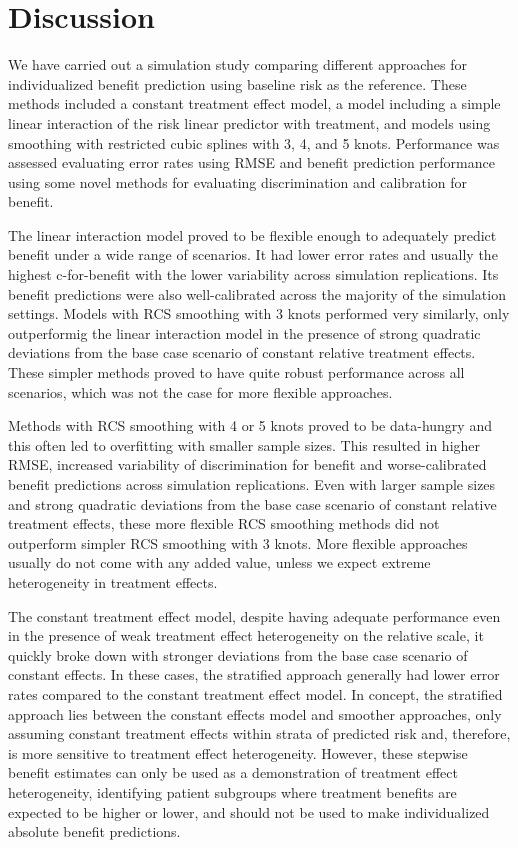 \documentclass{article}
\begin{document}
\hypertarget{discussion}{%
\section{Discussion}\label{discussion}}

We have carried out a simulation study comparing different approaches
for individualized benefit prediction using baseline risk as the
reference. These methods included a constant treatment effect model, a
model including a simple linear interaction of the risk linear predictor
with treatment, and models using smoothing with restricted cubic splines
with 3, 4, and 5 knots. Performance was assessed evaluating error rates
using RMSE and benefit prediction performance using some novel methods
for evaluating discrimination and calibration for benefit.

The linear interaction model proved to be flexible enough to adequately
predict benefit under a wide range of scenarios. It had lower error
rates and usually the highest c-for-benefit with the lower variability
across simulation replications. Its benefit predictions were also
well-calibrated across the majority of the simulation settings. Models
with RCS smoothing with 3 knots performed very similarly, only
outperformig the linear interaction model in the presence of strong
quadratic deviations from the base case scenario of constant relative
treatment effects. These simpler methods proved to have quite robust
performance across all scenarios, which was not the case for more
flexible approaches.

Methods with RCS smoothing with 4 or 5 knots proved to be data-hungry
and this often led to overfitting with smaller sample sizes. This
resulted in higher RMSE, increased variability of discrimination for
benefit and worse-calibrated benefit predictions across simulation
replications. Even with larger sample sizes and strong quadratic
deviations from the base case scenario of constant relative treatment
effects, these more flexible RCS smoothing methods did not outperform
simpler RCS smoothing with 3 knots. More flexible approaches usually do
not come with any added value, unless we expect extreme heterogeneity in
treatment effects.

The constant treatment effect model, despite having adequate performance
even in the presence of weak treatment effect heterogeneity on the
relative scale, it quickly broke down with stronger deviations from the
base case scenario of constant effects. In these cases, the stratified
approach generally had lower error rates compared to the constant
treatment effect model. In concept, the stratified approach lies between
the constant effects model and smoother approaches, only assuming
constant treatment effects within strata of predicted risk and,
therefore, is more sensitive to treatment effect heterogeneity. However,
these stepwise benefit estimates can only be used as a demonstration of
treatment effect heterogeneity, identifying patient subgroups where
treatment benefits are expected to be higher or lower, and should not be
used to make individualized absolute benefit predictions.
\end{document}
